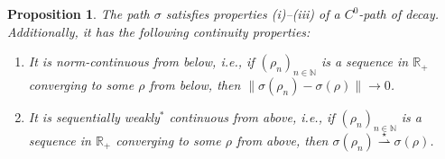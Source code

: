 \documentclass[10pt, oneside, a4paper]{article}
\newcommand{\N}{\mathbb{N}}
\newcommand{\R}{\mathbb{R}}
\newtheorem{proposition}{Proposition}[section]
\begin{document}
\begin{proposition}\label{prop_maxmbi_path}
The path $\sigma$ satisfies properties (i)--(iii) of a $C^0$-path of decay. Additionally, it has the following continuity properties:%
\begin{enumerate}
\item[(C1)] It is norm-continuous from below, i.e., if $(\rho_n)_{n \in \N}$ is a sequence in $\R_+$ converging to some $\rho$ from below, then $\|\sigma(\rho_n) - \sigma(\rho)\| \rightarrow 0$.%
\item[(C2)] It is sequentially weakly$^*$ continuous from above, i.e., if $(\rho_n)_{n \in \N}$ is a sequence in $\R_+$ converging to some $\rho$ from above, then $\sigma(\rho_n) \stackrel{\star}{\rightharpoonup} \sigma(\rho)$.%
\end{enumerate}
\end{proposition}
\end{document}
